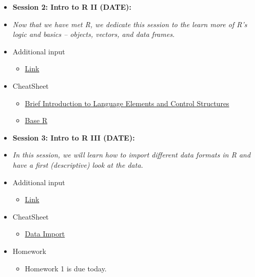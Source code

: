 \documentclass{article}
\begin{document}
\begin{itemize}
\vspace{0.5cm}
\item[] \textbf{Session 2: Intro to \textsf{R} II (DATE):}
\item[] \textit{Now that we have met \textsf{R}, we dedicate this session to the learn more of \textsf{R}'s logic and basics --  objects, vectors, and data frames.}
\item[] \faEdit \space Additional input
\begin{itemize} 
\item[$\square$] \href{url}{Link}
\end{itemize}
\item[] \faLightbulbO \space CheatSheet
\begin{itemize} 
\item[$\square$] \href{https://ugoproto.github.io/ugo_r_doc/R-Cheat-Sheet-Brief-Introduction-to-Language-Elements-and-Control-Structures.pdf}{Brief Introduction to Language Elements and Control Structures}
\item[$\square$] \href{https://www.rstudio.com/wp-content/uploads/2016/05/base-r.pdf}{Base \textsf{R}}
\end{itemize}

\item[] \textbf{Session 3: Intro to \textsf{R} III (DATE):}
\item[] \textit{In this session, we will learn how to import different data formats in \textsf{R} and have a first (descriptive) look at the data.}
\item[] \faEdit \space Additional input
\begin{itemize} 
\item[$\square$] \href{url}{Link}
\end{itemize}
\item[] \faLightbulbO \space CheatSheet
\begin{itemize} 
\item[$\square$] \href{https://ugoproto.github.io/ugo_r_doc/data-import.pdf}{Data Import}
\end{itemize}
\item[] \faExclamation \space Homework
\begin{itemize} 
\item[$\square$] Homework 1 is due today.
\end{itemize}


\end{itemize}
\end{document}
